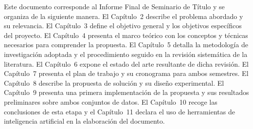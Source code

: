 Este documento corresponde al Informe Final de Seminario de Título y se organiza de la siguiente manera. El Capítulo~2 describe el problema abordado y su relevancia. El Capítulo~3 define el objetivo general y los objetivos específicos del proyecto. El Capítulo~4 presenta el marco teórico con los conceptos y técnicas necesarios para comprender la propuesta. El Capítulo~5 detalla la metodología de investigación adoptada y el procedimiento seguido en la revisión sistemática de la literatura. El Capítulo~6 expone el estado del arte resultante de dicha revisión. El Capítulo~7 presenta el plan de trabajo y su cronograma para ambos semestres. El Capítulo~8 describe la propuesta de solución y su diseño experimental. El Capítulo~9 presenta una primera implementación de la propuesta y sus resultados preliminares sobre ambos conjuntos de datos. El Capítulo~10 recoge las conclusiones de esta etapa y el Capítulo~11 declara el uso de herramientas de inteligencia artificial en la elaboración del documento.